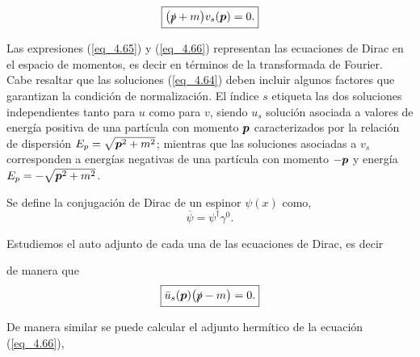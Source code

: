 \begin{equation}
	\boxed{\qty(  \slashed{p}  + m ) v_s (\vb*{p})  = 0.}
	\label{eq_4.66}
\end{equation}
  
Las expresiones (\ref{eq_4.65}) y (\ref{eq_4.66}) representan las ecuaciones de Dirac en el espacio de momentos, es decir en términos de la transformada de Fourier.\\

Cabe resaltar que las soluciones (\ref{eq_4.64}) deben incluir algunos factores que garantizan la condición de normalización. El índice $ s $ etiqueta las dos soluciones independientes tanto para $u$ como para $v$, siendo $ u_{s} $ solución asociada a valores de energía positiva de una partícula con momento $\vb*{p}$ caracterizados por la relación de dispersión $ E_{p} = \sqrt{ \vb*{p}^2 + m^2 } $; mientras que las soluciones asociadas a $v_s$ corresponden a energías negativas de una partícula con momento $-\vb*{p}$ y energía $ E_{p} = -\sqrt{ \vb*{p}^2 + m^2 } $.\\

\begin{definition}
	Se define la conjugación de Dirac de un espinor $\psi(x)$ como,
	\begin{equation}
		\overline{\psi} = \psi^\dag \gamma^0.
	\end{equation}
\end{definition}

Estudiemos el auto adjunto de cada una de las ecuaciones de Dirac, es decir
de manera que 
\begin{equation}
	\boxed{
	\bar{u}_s(\vb*{p}) \qty( \slashed{p} - m ) = 0.}
	\label{eq_4.68}
\end{equation}
 
 De manera similar se puede calcular el adjunto hermítico de la ecuación (\ref{eq_4.66}),
 
